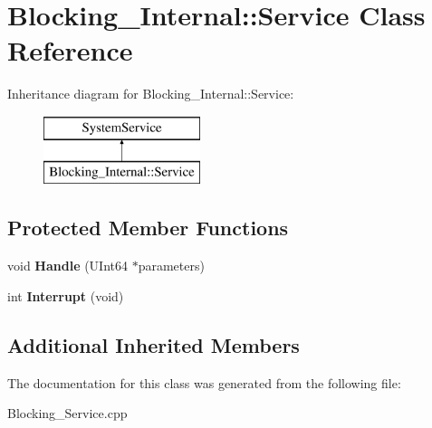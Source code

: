 \hypertarget{class_blocking___internal_1_1_service}{}\section{Blocking\+\_\+\+Internal\+:\+:Service Class Reference}
\label{class_blocking___internal_1_1_service}
Inheritance diagram for Blocking\+\_\+\+Internal\+:\+:Service\+:\begin{figure}[H]
\begin{center}
\leavevmode
\includegraphics[height=2.000000cm]{class_blocking___internal_1_1_service}
\end{center}
\end{figure}
\subsection*{Protected Member Functions}
\begin{DoxyCompactItemize}
\item 
\mbox{\label{class_blocking___internal_1_1_service_af8b5921a35c419b05c2b94d8ceca64b7}} 
void {\bfseries Handle} (U\+Int64 $\ast$parameters)
\item 
\mbox{\label{class_blocking___internal_1_1_service_ad4682845d5e7d3eaeb16a2c857ecbe83}} 
int {\bfseries Interrupt} (void)
\end{DoxyCompactItemize}
\subsection*{Additional Inherited Members}


The documentation for this class was generated from the following file\+:\begin{DoxyCompactItemize}
\item 
Blocking\+\_\+\+Service.\+cpp\end{DoxyCompactItemize}
